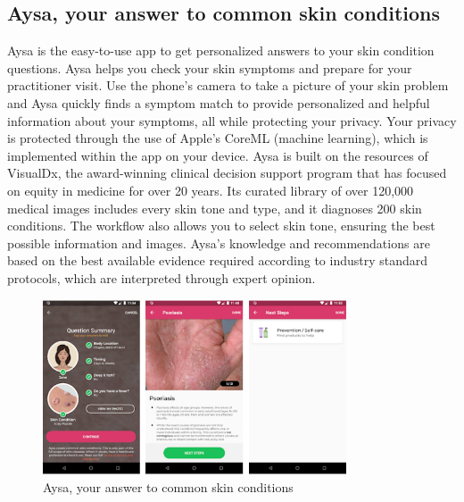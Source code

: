 \documentclass{article}
\begin{document}
\subsection{Aysa, your answer to common skin conditions}Aysa is the easy-to-use app to get personalized answers to your skin condition questions.
Aysa helps you check your skin symptoms and prepare for your practitioner visit.
 Use the phone's camera to take a picture of your skin problem and Aysa quickly finds a symptom match to provide personalized and helpful information about your symptoms, all while protecting your privacy. Your privacy is protected through the use of Apple's CoreML (machine learning), which is implemented within the app on your device.
 Aysa is built on the resources of VisualDx, the award-winning clinical decision support program that has focused on equity in medicine for over 20 years.
Its curated library of over 120,000 medical images includes every skin tone and type, and it diagnoses 200 skin conditions.
 The workflow also allows you to select skin tone, ensuring the best possible information and images.
Aysa's knowledge and recommendations are based on the best available evidence required according to industry standard protocols, which are interpreted through expert opinion.
\begin{figure}[H]
 \centering 
 \includegraphics[heigH= 8cm, width=9cm]{Figures/Aysa.PNG}
 \caption{Aysa, your answer to common skin conditions}
\end{figure}
 
\end{document}
